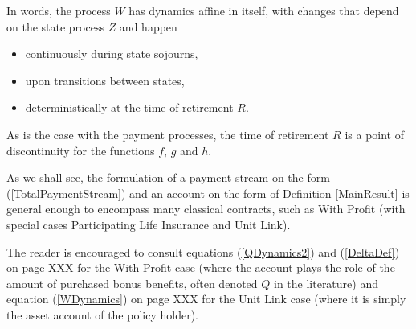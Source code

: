 \documentclass{book}
\newcommand{\1}[1]{\mathbbm{1}_{\left\lbrace #1 \right\rbrace}}
\theoremstyle{break}
\theoremstyle{remark}
\numberwithin{equation}{section}
\begin{document}
In words, the process $W$ has dynamics affine in itself, with changes that depend on the state process $Z$ and happen

\begin{itemize}
	\item continuously during state sojourns,
	\item upon transitions between states,
	\item deterministically at the time of retirement $R$.
\end{itemize}

As is the case with the payment processes, the time of retirement $R$ is a point of discontinuity for the functions $f$, $g$ and $h$.

As we shall see, the formulation of a payment stream on the form (\ref{TotalPaymentStream}) and an account on the form of Definition \ref{MainResult} is general enough to encompass many classical contracts, such as With Profit (with special cases Participating Life Insurance and Unit Link).

The reader is encouraged to consult equations (\ref{QDynamics2}) and (\ref{DeltaDef}) on page XXX for the With Profit case (where the account plays the role of the amount of purchased bonus benefits, often denoted $Q$ in the literature) and equation (\ref{WDynamics}) on page XXX for the Unit Link case (where it is simply the asset account of the policy holder).
\end{document}
